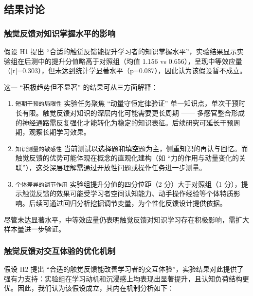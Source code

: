 \documentclass[runningheads]{llncs}
\begin{document}
\subsection{结果讨论}
\subsubsection{触觉反馈对知识掌握水平的影响} 
假设 H1 提出 “合适的触觉反馈能提升学习者的知识掌握水平”，实验结果显示实验组在后测中的提升分值略高于对照组（均值 1.156 vs 0.656），呈现中等效应量（|r|=0.303），但未达到统计学显著水平（p=0.087），因此认为该假设暂不成立。

这一 “积极趋势但不显著” 的结果可从三方面解释：

\begin{enumerate}[label={\arabic*)}]
  \item \texttt{短期干预的局限性} 实验任务聚焦 “动量守恒定律验证” 单一知识点，单次干预时长有限。触觉反馈对知识的深层内化可能需要更长周期 —— 多感官整合形成的神经通路需反复强化才能转化为稳定的知识表征。后续研究可延长干预周期，观察长期学习效果。
  \item \texttt{知识测量的敏感性} 当前测试以选择题和填空题为主，侧重知识的再认与回忆。而触觉反馈的优势可能体现在概念的直观化建构（如 “力的作用与动量变化的关联”），这类深层理解需通过开放性问题或操作任务进一步测量。
  \item \texttt{个体差异的调节作用} 实验组提升分值的四分位距（2 分）大于对照组（1 分），提示触觉反馈的效果可能受学习者空间认知能力、动手操作经验等个体特质影响。后续可通过回归分析挖掘调节变量，为个性化反馈设计提供依据。
\end{enumerate}

尽管未达显著水平，中等效应量仍表明触觉反馈对知识学习存在积极影响，需扩大样本量进一步验证。

\subsubsection{触觉反馈对交互体验的优化机制}
假设 H2 提出 “合适的触觉反馈能改善学习者的交互体验”，实验结果对此提供了强有力支持：实验组在学习动机和沉浸感上均表现出显著提升，且认知负荷结构更优。因此，我们认为该假设成立，其内在机制分析如下：
\end{document}
